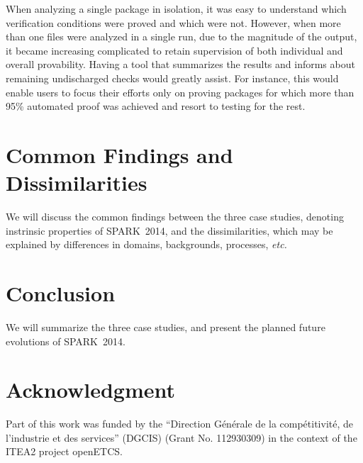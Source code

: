 \documentclass[10pt,a4paper,twocolumn]{article}
\newcommand{\openetcs}{openETCS\xspace}
\newcommand{\newspark}{SPARK~2014\xspace}
\newcommand{\etc}{\textit{etc.}\xspace}
\begin{document}
When analyzing a single package in isolation, it was easy to
understand which verification conditions were proved and which were
not. However, when more than one files were analyzed in a single run,
due to the magnitude of the output, it became increasing complicated
to retain supervision of both individual and overall
provability. Having a tool that summarizes the results and informs
about remaining undischarged checks would greatly assist. For
instance, this would enable users to focus their efforts only on
proving packages for which more than 95\% automated proof was
achieved and resort to testing for the rest.

\section{Common Findings and Dissimilarities}

We will discuss the common findings between the three case studies,
denoting instrinsic properties of \newspark, and the dissimilarities,
which may be explained by differences in domains, backgrounds,
processes, \etc

\section{Conclusion}

We will summarize the three case studies, and present the planned future
evolutions of \newspark.

\section{Acknowledgment}

Part of this work was funded by the ``Direction Générale de la
compétitivité, de l'industrie et des services'' (DGCIS) (Grant
No. 112930309) in the context of the ITEA2 project \openetcs.



\end{document}
